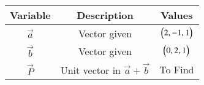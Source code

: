 
\begin{tabular}[12pt]{ |c| c| c|}
    \hline
    \textbf{Variable} & \textbf{Description} & \textbf{Values} \\ 
    \hline
    $\vec{a}$ & Vector given & $\begin{pmatrix}2,-1,1\end{pmatrix}$ \\
    \hline
    $\vec{b}$ & Vector given & $\begin{pmatrix}0,2,1\end{pmatrix}$ \\
    \hline
    $\vec{P}$ & Unit vector in  $\vec{a}+\vec{b}$ & To Find\\
    \hline 
    \end{tabular}


